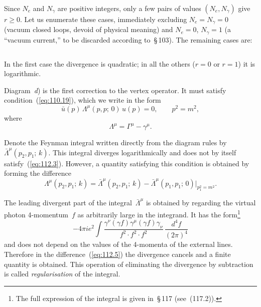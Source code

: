 
Since $N_e$ and $N_\gamma$ are positive integers, only a few pairs of values $(N_e, N_\gamma)$ give $r \geq 0$. Let us enumerate these cases, immediately excluding $N_e = N_\gamma = 0$ (vacuum closed loops, devoid of physical meaning) and $N_e = 0$, $N_\gamma = 1$ (a ``vacuum current,'' to be discarded according to~\S\,103). The remaining cases are:

\begin{equation}
\label{eq:112.2}
\end{equation}

In the first case the divergence is quadratic; in all the others ($r = 0$ or $r = 1$) it is logarithmic.

Diagram~\textit{d}) is the first correction to the vertex operator. It must satisfy condition~(\ref{eq:110.19}), which we write in the form
\begin{equation}
\bar{u}(p)\,\Lambda^\mu(p,p;\,0)\,u(p) = 0, \qquad p^2 = m^2,
\label{eq:112.3}
\end{equation}
where
\begin{equation}
\Lambda^\mu = \Gamma^\mu - \gamma^\mu.
\label{eq:112.4}
\end{equation}

Denote the Feynman integral written directly from the diagram rules by $\bar{\Lambda}^\mu(p_2, p_1;\,k)$. This integral diverges logarithmically and does not by itself satisfy~(\ref{eq:112.3}). However, a quantity satisfying this condition is obtained by forming the difference
\begin{equation}
\Lambda^\mu(p_2, p_1;\,k) = \bar{\Lambda}^\mu(p_2, p_1;\,k) - \bar{\Lambda}^\mu(p_1, p_1;\,0)\big|_{p_1^2 = m^2}.
\label{eq:112.5}
\end{equation}

The leading divergent part of the integral~$\bar{\Lambda}^\mu$ is obtained by regarding the virtual photon 4-momentum~$f$ as arbitrarily large in the integrand. It has the form\footnote{The full expression of the integral is given in~\S\,117 (see~(117.2)).}
\[
-4\pi i e^2 \int \frac{\gamma^\nu(\gamma f)\gamma^\mu(\gamma f)\gamma_\nu}{f^2 \cdot f^2 \cdot f^2}\,\frac{d^4f}{(2\pi)^4}
\]
and does not depend on the values of the 4-momenta of the external lines. Therefore in the difference~(\ref{eq:112.5}) the divergence cancels and a finite quantity is obtained. This operation of eliminating the divergence by subtraction is called \emph{regularisation} of the integral.

